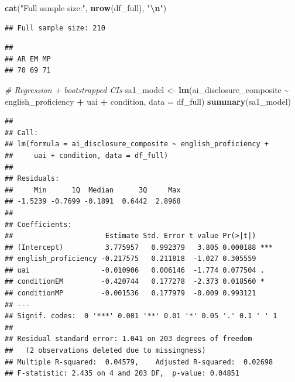 \documentclass[
]{article}
\newenvironment{Shaded}{\begin{snugshade}}{\end{snugshade}}
\newcommand{\AttributeTok}[1]{\textcolor[rgb]{0.13,0.29,0.53}{#1}}
\newcommand{\CommentTok}[1]{\textcolor[rgb]{0.56,0.35,0.01}{\textit{#1}}}
\newcommand{\FunctionTok}[1]{\textcolor[rgb]{0.13,0.29,0.53}{\textbf{#1}}}
\newcommand{\NormalTok}[1]{#1}
\newcommand{\OtherTok}[1]{\textcolor[rgb]{0.56,0.35,0.01}{#1}}
\newcommand{\SpecialCharTok}[1]{\textcolor[rgb]{0.81,0.36,0.00}{\textbf{#1}}}
\newcommand{\StringTok}[1]{\textcolor[rgb]{0.31,0.60,0.02}{#1}}
\begin{document}
\begin{Shaded}
\begin{Highlighting}[]
\FunctionTok{cat}\NormalTok{(}\StringTok{"Full sample size:"}\NormalTok{, }\FunctionTok{nrow}\NormalTok{(df\_full), }\StringTok{"}\SpecialCharTok{\textbackslash{}n}\StringTok{"}\NormalTok{)}
\end{Highlighting}
\end{Shaded}

\begin{verbatim}
## Full sample size: 210
\end{verbatim}

\begin{Shaded}
\end{Shaded}

\begin{verbatim}
## 
## AR EM MP 
## 70 69 71
\end{verbatim}

\begin{Shaded}
\begin{Highlighting}[]
\CommentTok{\# Regression + bootstrapped CIs}
\NormalTok{sa1\_model }\OtherTok{\textless{}{-}} \FunctionTok{lm}\NormalTok{(ai\_disclosure\_composite }\SpecialCharTok{\textasciitilde{}}\NormalTok{ english\_proficiency }\SpecialCharTok{+}\NormalTok{ uai }\SpecialCharTok{+}\NormalTok{ condition,}
                \AttributeTok{data =}\NormalTok{ df\_full)}
\FunctionTok{summary}\NormalTok{(sa1\_model)}
\end{Highlighting}
\end{Shaded}

\begin{verbatim}
## 
## Call:
## lm(formula = ai_disclosure_composite ~ english_proficiency + 
##     uai + condition, data = df_full)
## 
## Residuals:
##     Min      1Q  Median      3Q     Max 
## -1.5239 -0.7699 -0.1891  0.6442  2.8968 
## 
## Coefficients:
##                      Estimate Std. Error t value Pr(>|t|)    
## (Intercept)          3.775957   0.992379   3.805 0.000188 ***
## english_proficiency -0.217575   0.211818  -1.027 0.305559    
## uai                 -0.010906   0.006146  -1.774 0.077504 .  
## conditionEM         -0.420744   0.177278  -2.373 0.018560 *  
## conditionMP         -0.001536   0.177979  -0.009 0.993121    
## ---
## Signif. codes:  0 '***' 0.001 '**' 0.01 '*' 0.05 '.' 0.1 ' ' 1
## 
## Residual standard error: 1.041 on 203 degrees of freedom
##   (2 observations deleted due to missingness)
## Multiple R-squared:  0.04579,    Adjusted R-squared:  0.02698 
## F-statistic: 2.435 on 4 and 203 DF,  p-value: 0.04851
\end{verbatim}
\end{document}
